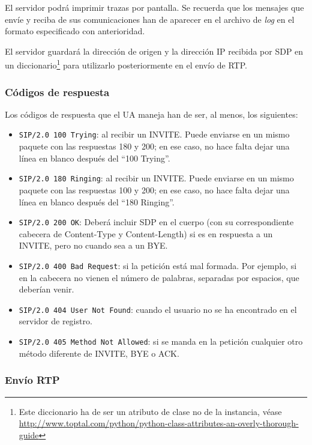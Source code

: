 \documentclass[a4paper,11pt]{article}
\begin{document}
El servidor podrá imprimir trazas por pantalla. Se recuerda que 
los mensajes que envíe y reciba de sus comunicaciones han de aparecer
en el archivo de \emph{log} en el formato especificado con anterioridad.

El servidor guardará la dirección de origen y la dirección IP recibida por SDP en un diccionario\footnote{Este diccionario ha de ser un atributo de clase no de la instancia, véase \url{http://www.toptal.com/python/python-class-attributes-an-overly-thorough-guide}} para utilizarlo posteriormente en el envío de RTP.



\subsubsection{Códigos de respuesta}

Los códigos de respuesta que el UA maneja han de ser, al menos, los siguientes:

   \begin{itemize}
     \item \texttt{SIP/2.0 100 Trying}: al recibir un INVITE. Puede enviarse en un mismo paquete con las respuestas 180 y 200; 
 en ese caso, no hace falta dejar una línea en blanco después del ``100 Trying''.
     \item \texttt{SIP/2.0 180 Ringing}: al recibir un INVITE. Puede enviarse en un mismo paquete con las respuestas 100 y 200; en ese caso, no hace falta dejar una línea en blanco después del ``180 Ringing''.
     \item \texttt{SIP/2.0 200 OK}: Deberá incluir SDP en el cuerpo (con su correspondiente cabecera de Content-Type y Content-Length) si es en respuesta a un INVITE, pero no cuando sea a un BYE.
     \item \texttt{SIP/2.0 400 Bad Request}: si la petición está mal formada. Por ejemplo, si en la cabecera no vienen el número de palabras, separadas por espacios, que deberían venir.
     \item \texttt{SIP/2.0 404 User Not Found}: cuando el usuario no se ha encontrado en el servidor de registro.
     \item \texttt{SIP/2.0 405 Method Not Allowed}: si se manda en la petición cualquier otro método diferente de INVITE, BYE o ACK.
   \end{itemize}
   

\subsubsection{Envío RTP}
\end{document}

